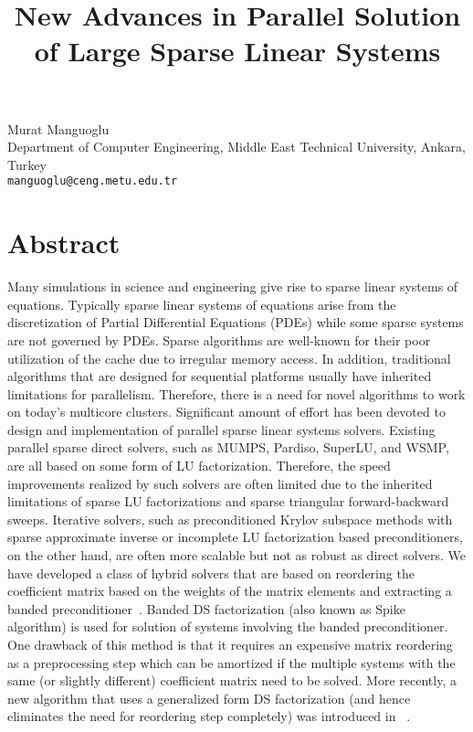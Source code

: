 \title{New Advances  in Parallel Solution of Large Sparse Linear Systems}
 \author{} \institute{}
\maketitle
\begin{center}
{\large Murat Manguoglu}\\
Department of Computer Engineering, Middle East Technical University, Ankara, Turkey \\
{\tt manguoglu@ceng.metu.edu.tr}

\end{center}

\section*{Abstract}

Many simulations in science and engineering give rise to sparse linear systems of equations.  Typically sparse linear systems of equations arise from the discretization of Partial Differential Equations (PDEs) while some sparse systems are not governed by PDEs.  Sparse algorithms are well-known for their poor utilization of the cache due to irregular memory access. In addition, traditional algorithms that are designed for sequential platforms usually have inherited limitations for parallelism. Therefore, there is a need for novel algorithms to work on today's multicore clusters. Significant amount of effort has been devoted to design and implementation of parallel sparse linear systems solvers. Existing parallel sparse direct solvers, such as MUMPS, Pardiso, SuperLU, and WSMP, are all based on some form of LU factorization. Therefore, the speed improvements realized by such solvers are often limited due to the inherited limitations of sparse LU factorizations and sparse triangular forward-backward sweeps. Iterative solvers, such as preconditioned Krylov subspace methods with sparse approximate inverse or incomplete LU factorization based preconditioners, on the other hand, are often more scalable but not as robust as direct solvers. We have developed a class of hybrid solvers that are based on reordering the coefficient matrix based on the weights of the matrix elements and extracting a banded preconditioner~\cite{wso}. Banded DS factorization (also known as Spike algorithm) is used for solution of systems involving the banded preconditioner. One drawback of this method is that it requires an expensive matrix reordering as a preprocessing step which can be amortized if the multiple systems with the same (or slightly different) coefficient matrix need to be solved. More  recently,  a  new  algorithm  that  uses  a  generalized  form  DS factorization  (and  hence  eliminates  the  need for reordering step completely) was introduced in ~\cite{ddps1,ddps2}. 

